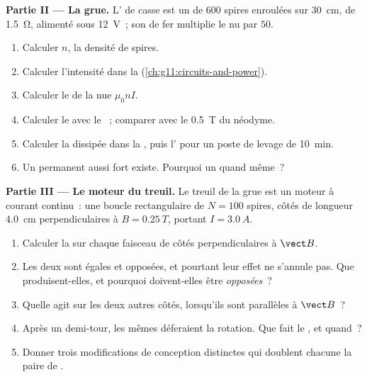 \begin{problem}
\medskip
\noindent\textbf{Partie II --- La grue.}
L' de casse est un
 de $600$ spires enroulées sur
\qty{30}{cm}, de 
\qty{1.5}{\ohm}, alimenté sous \qty{12}{V}~; son  de fer multiplie
le  nu par $50$.
\begin{enumerate}[resume]
  \item Calculer $n$, la densité de spires.
  \item Calculer l'intensité dans la
        (\cref{ch:g11:circuits-and-power}).
  \item Calculer le  de la
         nue $\mu_0 n I$.
  \item Calculer le  avec le
        ~; comparer avec le \qty{0.5}{T} du néodyme.
  \item Calculer la  dissipée dans
        la , puis
        l' pour un poste de levage de
        \qty{10}{\minute}.
  \item Un  permanent aussi fort existe.
        Pourquoi un 
        quand même~?
\end{enumerate}

\medskip
\noindent\textbf{Partie III --- Le moteur du treuil.}
Le treuil de la grue est un moteur à courant continu~: une boucle
rectangulaire de $N = 100$ spires, côtés de longueur \qty{4.0}{cm}
perpendiculaires à $B = \qty{0.25}{T}$, portant $I = \qty{3.0}{A}$.
\begin{enumerate}[resume]
  \item Calculer la  sur
        chaque faisceau de côtés perpendiculaires à $\vect B$.
  \item Les deux  sont égales et opposées,
        et pourtant leur effet ne s'annule pas. Que produisent-elles, et
        pourquoi doivent-elles être \emph{opposées}~?
  \item Quelle  agit sur les deux autres
        côtés, lorsqu'ils sont parallèles à $\vect B$~?
  \item Après un demi-tour, les mêmes
         déferaient la rotation. Que
        fait le , et quand~?
  \item Donner trois modifications de conception distinctes qui
        doublent chacune la paire de
        .
\end{enumerate}


\end{problem}
